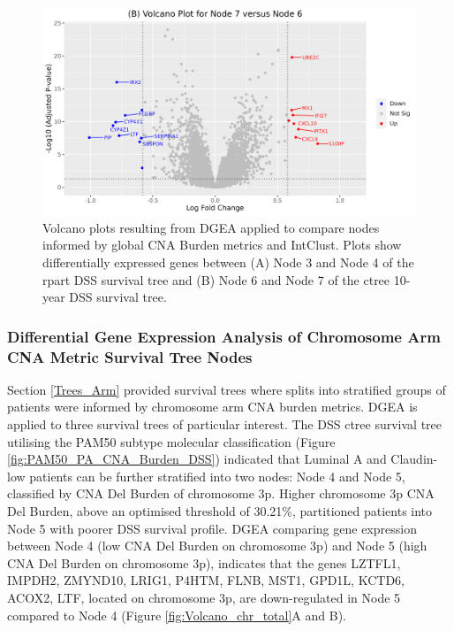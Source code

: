 \begin{figure}[!ht]
\begin{center}
\begin{multicols}{2}
    \includegraphics[width=1\linewidth]{../figures/Chapter_4/Volcano_4.png}\par 
 
\end{multicols}
\caption[Volcano plots resulting from DGEA applied to compare nodes informed by global CNA Burden metrics and IntClust.]{Volcano plots resulting from DGEA applied to compare nodes informed by global CNA Burden metrics and IntClust. Plots show differentially expressed genes between (A) Node 3 and Node 4 of the rpart DSS survival tree and (B) Node 6 and Node 7 of the ctree 10-year DSS survival tree.}
\label{fig:DGEA_Global_VP_IC}
\end{center}
\end{figure}

\subsubsection{Differential Gene Expression Analysis of Chromosome Arm CNA Metric Survival Tree Nodes}
\label{Sec_limma_2}
Section \ref{Trees_Arm} provided survival trees where splits into stratified groups of patients were informed by chromosome arm CNA burden metrics. DGEA is applied to three survival trees of particular interest. The DSS ctree survival tree utilising the PAM50 subtype molecular classification (Figure \ref{fig:PAM50_PA_CNA_Burden_DSS}) indicated that Luminal A and Claudin-low patients can be further stratified into two nodes: Node 4 and Node 5, classified by CNA Del Burden of chromosome 3p. Higher chromosome 3p CNA Del Burden, above an optimised threshold of 30.21\%, partitioned patients into Node 5 with poorer DSS survival profile. DGEA comparing gene expression between Node 4 (low CNA Del Burden on chromosome 3p) and Node 5 (high CNA Del Burden on chromosome 3p), indicates that the genes LZTFL1, IMPDH2, ZMYND10, LRIG1, P4HTM, FLNB, MST1, GPD1L, KCTD6, ACOX2, LTF, located on chromosome 3p, are down-regulated in Node 5 compared to Node 4 (Figure \ref{fig:Volcano_chr_total}A and B). 

